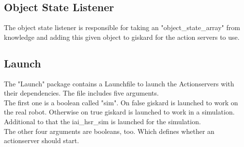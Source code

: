 \documentclass[main.tex]{subfiles}
\begin{document}
	\vspace{1cm}
	
	\subsection{Object State Listener}
	The object state listener is responsible for taking an "object\_state\_array" from knowledge and adding this given object to giskard for the action servers to use.
	
	\vspace{1cm}
	
	\subsection{Launch}
	The "Launch" package contains a Launchfile to launch the Actionservers with their dependencies. The file includes five arguments.\\
	The first one is a boolean called "sim". On false giskard is launched to work on the real robot. Otherwise on true giskard is launched to work in a simulation. Additional to that the iai\_hsr\_sim is launched for the simulation.\\
	The other four arguments are booleans, too. Which defines whether an actionserver should start. 
\end{document}
